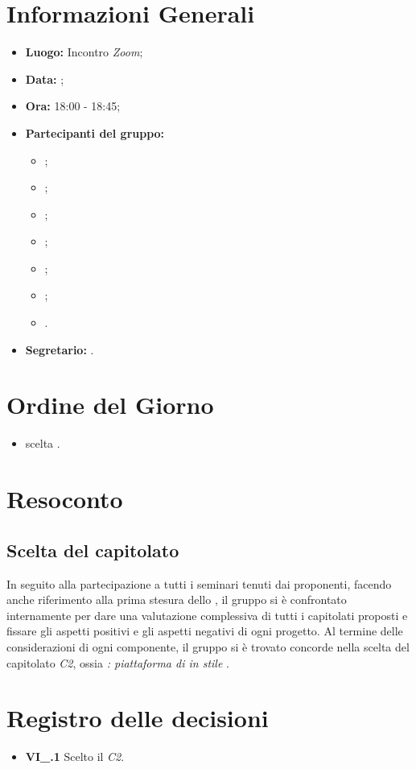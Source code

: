 \section{Informazioni Generali}
\begin{itemize}
\item \textbf{Luogo:} Incontro \textit{Zoom};
\item \textbf{Data:} \Data;
\item \textbf{Ora:} 18:00 - 18:45;
\item \textbf{Partecipanti del gruppo:}
	\begin{itemize}
		\item \BL{}; 
		\item \FF{};
		\item \MM{}; 
		\item \PC{};
		\item \TG{};
		\item \TL{};
		\item \VD{}.
	\end{itemize} 
\item \textbf{Segretario:} \PC{}.
\end{itemize}

\section{Ordine del Giorno}
\begin{itemize}
 \item scelta .
\end{itemize}

\section{Resoconto}
\subsection{Scelta del capitolato}
In seguito alla partecipazione a tutti i seminari tenuti dai proponenti, facendo anche riferimento alla prima stesura dello \textit{\SdF}, il gruppo si è confrontato internamente per dare una valutazione complessiva di tutti i capitolati proposti e fissare gli aspetti positivi e gli aspetti negativi di ogni progetto.
Al termine delle considerazioni di ogni componente, il gruppo si è trovato concorde nella scelta del capitolato \textit{C2}, ossia \textit{\NomeProgetto: piattaforma di  in stile }.

\section{Registro delle decisioni}
\begin{itemize}
	\item \textbf{VI\_\Data.1} Scelto il  \textit{C2}.
\end{itemize}




